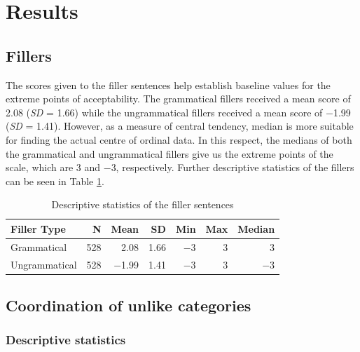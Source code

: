 \section{Results} \label{sec:resultsexp}

\subsection{Fillers}

The scores given to the filler sentences help establish baseline values for the extreme points of acceptability. The grammatical fillers received a mean score of 2.08 (\textit{SD} = 1.66) while the ungrammatical fillers received a mean score of $-$1.99 (\textit{SD} = 1.41). However, as a measure of central tendency, median is more suitable for finding the actual centre of ordinal data. In this respect, the medians of both the grammatical and ungrammatical fillers give us the extreme points of the scale, which are 3 and $-$3, respectively. Further descriptive statistics of the fillers can be seen in Table \ref{tab:filler_descriptive}.

\begin{table}[!h]
	\centering
	\begin{tabular}{lrrrrrr}
		\textbf{Filler Type} & \textbf{N} & \textbf{Mean} & \textbf{SD} & \textbf{Min} & \textbf{Max} & \textbf{Median} \\ 
		\hline \hline
		Grammatical & 528 & 2.08 & 1.66 & $-$3 & 3 & 3\\ 
		Ungrammatical & 528 & $-$1.99 & 1.41 & $-$3 & 3 & $-$3 \\ 
		\hline
		\hline
	\end{tabular}
	\caption{Descriptive statistics of the filler sentences}
	\label{tab:filler_descriptive}
\end{table}

\subsection{Coordination of unlike categories}
\subsubsection{Descriptive statistics}

